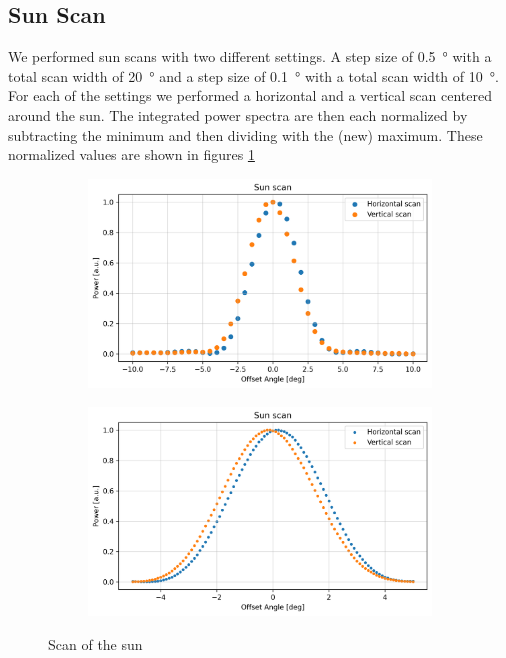 \subsection{Sun Scan}
We performed sun scans with two different settings.
A step size of \SI{0.5}{\degree} with a total scan width of \SI{20}{\degree} and a step size of \SI{0.1}{\degree} with a total scan width of \SI{10}{\degree}.
For each of the settings we performed a horizontal and a vertical scan centered around the sun.
The integrated power spectra are then each normalized by subtracting the minimum and then dividing with the (new) maximum.
These normalized values are shown in figures \ref{fig:sun_scan}

\begin{figure}[ht]
    \centering
    \begin{subfigure}[t]{0.45\linewidth}
        \includegraphics[width=\linewidth]{assets/sun_scan_low_res.png}
    \end{subfigure}
    \begin{subfigure}[t]{0.45\linewidth}
        \includegraphics[width=\linewidth]{assets/sun_scan_high_res.png}
    \end{subfigure}
    \caption{Scan of the sun}
    \label{fig:sun_scan}
\end{figure}

